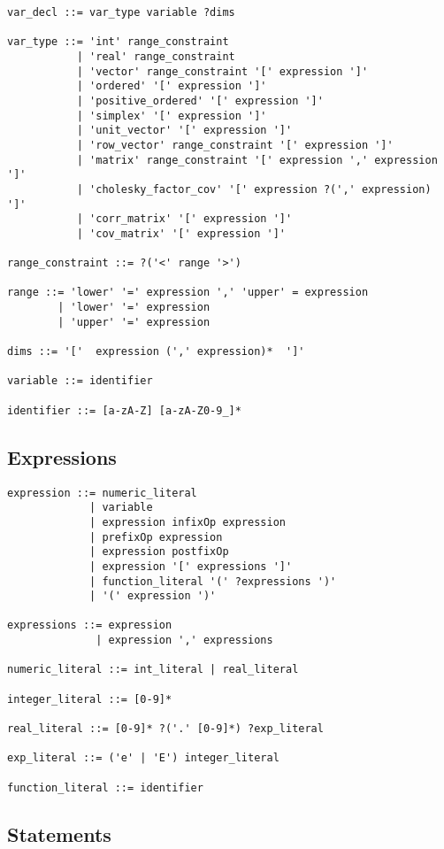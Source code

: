 {
\small
\begin{Verbatim}[fontsize=\small]
var_decl ::= var_type variable ?dims

var_type ::= 'int' range_constraint
           | 'real' range_constraint
           | 'vector' range_constraint '[' expression ']'
           | 'ordered' '[' expression ']'
           | 'positive_ordered' '[' expression ']'
           | 'simplex' '[' expression ']'
           | 'unit_vector' '[' expression ']'
           | 'row_vector' range_constraint '[' expression ']'
           | 'matrix' range_constraint '[' expression ',' expression ']'
           | 'cholesky_factor_cov' '[' expression ?(',' expression) ']'
           | 'corr_matrix' '[' expression ']'
           | 'cov_matrix' '[' expression ']'

range_constraint ::= ?('<' range '>')

range ::= 'lower' '=' expression ',' 'upper' = expression
        | 'lower' '=' expression
        | 'upper' '=' expression

dims ::= '['  expression (',' expression)*  ']'

variable ::= identifier

identifier ::= [a-zA-Z] [a-zA-Z0-9_]*
\end{Verbatim}
}

\subsection{Expressions}

{
\small
\begin{Verbatim}[fontsize=\small]
expression ::= numeric_literal
             | variable
             | expression infixOp expression
             | prefixOp expression
             | expression postfixOp
             | expression '[' expressions ']'
             | function_literal '(' ?expressions ')'
             | '(' expression ')'

expressions ::= expression
              | expression ',' expressions

numeric_literal ::= int_literal | real_literal

integer_literal ::= [0-9]*

real_literal ::= [0-9]* ?('.' [0-9]*) ?exp_literal
                  
exp_literal ::= ('e' | 'E') integer_literal

function_literal ::= identifier
\end{Verbatim}
}

\subsection{Statements}

